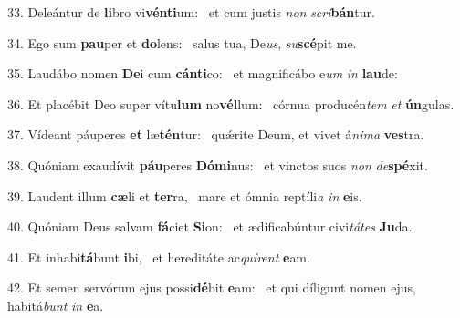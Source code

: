 33. Deleántur de \textbf{li}bro vi\textbf{vén}\textbf{ti}um: \ast\  et cum justis \textit{non} \textit{scri}\textbf{bán}tur.\

34. Ego sum \textbf{pau}per et \textbf{do}lens: \ast\  salus tua, De\textit{us}, \textit{su}\textbf{scé}pit me.\

35. Laudábo nomen \textbf{De}i cum \textbf{cán}\textbf{ti}co: \ast\  et magnificábo e\textit{um} \textit{in} \textbf{lau}de:\

36. Et placébit Deo super vítu\textbf{lum} no\textbf{vél}lum: \ast\  córnua producén\textit{tem} \textit{et} \textbf{ún}gulas.\

37. Vídeant páuperes \textbf{et} læ\textbf{tén}tur: \ast\  quǽrite Deum, et vivet á\textit{ni}\textit{ma} \textbf{ves}tra.\

38. Quóniam exaudívit \textbf{páu}peres \textbf{Dó}\textbf{mi}nus: \ast\  et vinctos suos \textit{non} \textit{de}\textbf{spé}xit.\

39. Laudent illum \textbf{cæ}li et \textbf{ter}ra, \ast\  mare et ómnia reptíli\textit{a} \textit{in} \textbf{e}is.\

40. Quóniam Deus salvam \textbf{fá}ciet \textbf{Si}on: \ast\  et ædificabúntur civi\textit{tá}\textit{tes} \textbf{Ju}da.\

41. Et inhabi\textbf{tá}bunt \textbf{i}bi, \ast\  et hereditáte ac\textit{quí}\textit{rent} \textbf{e}am.\

42. Et semen servórum ejus possi\textbf{dé}bit \textbf{e}am: \ast\  et qui díligunt nomen ejus, habitá\textit{bunt} \textit{in} \textbf{e}a.\

